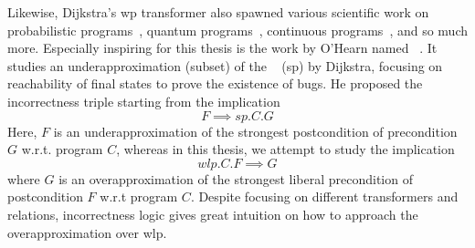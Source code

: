 Likewise, Dijkstra's wp transformer also spawned various scientific work on probabilistic programs~\cite{kaminski2016weakest}, quantum programs~\cite{liu22}, continuous programs~\cite{boreale20}, and so much more.
Especially inspiring for this thesis is the work by O'Hearn named ~\cite{ohearn2020IncorrectnessLogic}. 
It studies an underapproximation (subset) of the ~\cite{dijkstra90} (sp) by Dijkstra, focusing on reachability of final states to prove the existence of bugs. 
He proposed the incorrectness triple starting from the implication 
$$F\implies sp.C.G$$
Here, $F$ is an underapproximation of the strongest postcondition of precondition $G$ w.r.t. program $C$, whereas in this thesis, we attempt to study the implication 
$$wlp.C.F\implies G$$ 
where $G$ is an overapproximation of the strongest liberal precondition of postcondition $F$ w.r.t program $C$. 
Despite focusing on different transformers and relations, incorrectness logic gives great intuition on how to approach the overapproximation over wlp.


